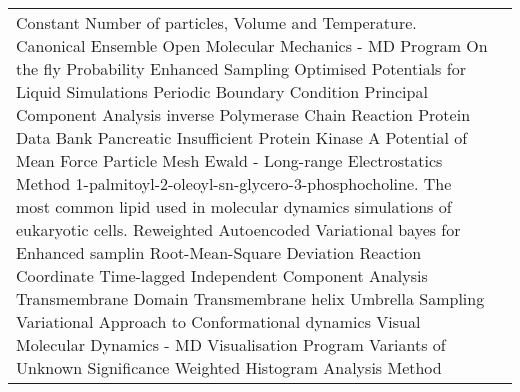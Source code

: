 \begin{center}
\begin{bfseries}
\begin{longtable}{@{}p{3cm}@{}p{\dimexpr\textwidth-1cm\relax}@{}}
\nomenclature{${\small NVT}$}      {Constant Number of particles, Volume and Temperature. Canonical Ensemble}
\nomenclature{${\small OpenMM}$}   {Open Molecular Mechanics - MD Program}
\nomenclature{${\small OPES}$}     {On the fly Probability Enhanced Sampling}
\nomenclature{${\small OPLS}$}     {Optimised Potentials for Liquid Simulations}
\nomenclature{${\small PBC}$}      {Periodic Boundary Condition}
\nomenclature{${\small PCA}$}      {Principal Component Analysis}
\nomenclature{${\small iPCR}$}     {inverse Polymerase Chain Reaction}
\nomenclature{${\small PDB}$}      {Protein Data Bank}
\nomenclature{${\small PI}$}       {Pancreatic Insufficient}
\nomenclature{${\small PKA}$}      {Protein Kinase A}
\nomenclature{${\small PMF}$}      {Potential of Mean Force}
\nomenclature{${\small PME}$}      {Particle Mesh Ewald - Long-range Electrostatics Method}
\nomenclature{${\small POPC}$}     {1-palmitoyl-2-oleoyl-sn-glycero-3-phosphocholine. The most common lipid used in molecular dynamics simulations of eukaryotic cells.}
\nomenclature{${\small RAVE}$}     {Reweighted Autoencoded Variational bayes for Enhanced samplin}
\nomenclature{${\small RMSD}$}     {Root-Mean-Square Deviation}
\nomenclature{${\small RC}$}       {Reaction Coordinate}
\nomenclature{${\small TICA}$}     {Time-lagged Independent Component Analysis}
\nomenclature{${\small TMD}$}     {Transmembrane Domain}
\nomenclature{${\small TMH}$}     {Transmembrane helix}
\nomenclature{${\small US}$}       {Umbrella Sampling}
\nomenclature{${\small VAC}$}      {Variational Approach to Conformational dynamics}
\nomenclature{${\small VMD}$}      {Visual Molecular Dynamics - MD Visualisation Program}
\nomenclature{${\small VUS}$}      {Variants of Unknown Significance}
\nomenclature{${\small WHAM}$}     {Weighted Histogram Analysis Method}
\end{longtable}
\end{bfseries}
\end{center}
